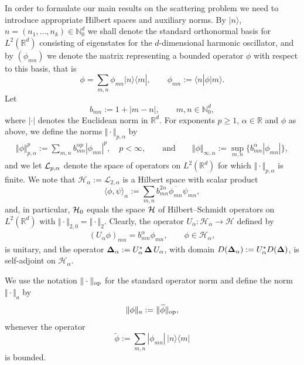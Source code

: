 \documentclass[11pt]{article}
\begin{document}
\setcounter{section}{1}
\setcounter{subsection}{0}
\setcounter{subsubsection}{0}
\setcounter{equation}{5}
\setcounter{theorem}{1}


 In order to formulate our main results on the scattering problem we
need to introduce ap\-propriate Hilbert spaces and auxiliary norms.
By $\vert n\rangle$, $n=(n_1,\dots,n_k)\in\mathbb N_0^d$ we shall denote the
standard orthonormal basis for $L^2(\mathbb R^d)$ consisting of
eigenstates for the $d$-dimensional harmonic oscillator, and by
$(\phi_{mn})$ we denote the matrix representing a bounded operator
$\phi$ with respect to this basis, that is
\[
\phi = \sum_{m,n}\phi_{mn}\vert n\rangle\langle m|,\qquad \phi_{mn}:=\langle n|\phi|m\rangle .
\]
Let
\[
b_{mn} := 1+|m-n| ,\qquad m,n\in \mathbb N_0^d ,
\]
where $|\cdot|$ denotes the Euclidean norm in $\mathbb R^d$. For
exponents $p\geq 1$, $\alpha\in\mathbb R$ and $\phi$ as above, we def\/ine
the norms $\Vert\cdot \Vert_{p,\alpha}$  by
\begin{gather}
\label{alphanorms}
\Vert\phi\Vert_{p,\alpha}^p := \sum_{m,n}b_{mn}^{\alpha p}|\phi_{mn}|^p ,
\quad p<\infty, \qquad\mbox{and}\qquad
\Vert\phi\Vert_{\infty,\alpha}:=\sup_{m,n}\{b_{mn}^\alpha|\phi_{mn}|\} ,
\end{gather}
and we let ${\cal L}_{p,\alpha}$ denote the space of operators
on $L^2(\mathbb R^d)$ for which
$\Vert\cdot \Vert_{p,\alpha}$ is f\/inite. We note that
$\mathcal H_{\alpha}:=\mathcal L_{2,\alpha}$ is a  Hilbert space with
scalar product
\[
\langle\phi,\psi\rangle_\alpha:=\sum_{m,n}b_{mn}^{2\alpha} \overline{\phi_{mn}}
 \psi_{mn} ,
\]
and, in particular, ${\cal H}_{0}$ equals  the space $\cal H$ of
Hilbert--Schmidt operators on $L^2(\mathbb R^d)$ with $\Vert\cdot\Vert_{2,0} =
\Vert\cdot\Vert_2$.
Clearly, the operator $U_\alpha:\mathcal H_\alpha\to \mathcal H$ def\/ined by
\begin{gather}\label{Ualpha}
(U_\alpha\phi)_{mn}=
b^{\alpha}_{mn}\phi_{mn} ,\qquad \phi\in\mathcal H_\alpha ,
\end{gather}
is unitary, and the operator
${\bf\Delta}_\alpha := U_\alpha^*\, {\bf \Delta}\,U_\alpha$, with domain
$D({\bf\Delta}_\alpha):=U_\alpha^* D({\bf \Delta})$,
 is self-adjoint on $\mathcal H_\alpha$.

We use the notation $\Vert\cdot\Vert_{\rm op}$ for
the standard operator norm and def\/ine the norm $\Vert\cdot\Vert_a$ by
\[
\Vert\phi\Vert_a := \Vert\widetilde\phi\Vert_{\rm op} ,
\]
whenever the operator
\[
 \widetilde\phi := \sum_{m,n}|\phi_{mn}|\, |n\rangle\langle m|
\]
 is bounded.
\end{document}
